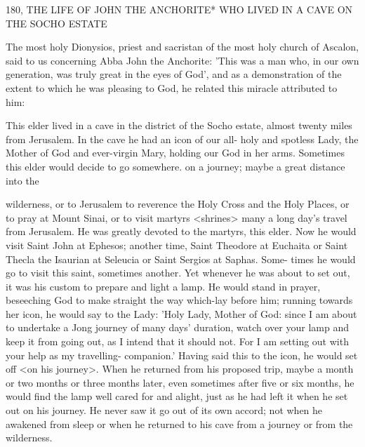 180, THE LIFE OF JOHN THE ANCHORITE*
WHO LIVED IN A CAVE ON THE SOCHO ESTATE

The most holy Dionysios, priest and sacristan of the most holy
church of Ascalon, said to us concerning Abba John the Anchorite:
'This was a man who, in our own generation, was truly great in the
eyes of God', and as a demonstration of the extent to which he was
pleasing to God, he related this miracle attributed to him:

This elder lived in a cave in the district of the Socho estate, almost
twenty miles from Jerusalem. In the cave he had an icon of our all-
holy and spotless Lady, the Mother of God and ever-virgin Mary,
holding our God in her arms. Sometimes this elder would decide to
go somewhere. on a journey; maybe a great distance into the

wilderness, or to Jerusalem to reverence the Holy Cross and the
Holy Places, or to pray at Mount Sinai, or to visit martyrs
<shrines> many a long day's travel from Jerusalem. He was greatly
devoted to the martyrs, this elder. Now he would visit Saint John
at Ephesos; another time, Saint Theodore at Euchaita or Saint
Thecla the Isaurian at Seleucia or Saint Sergios at Saphas. Some-
times he would go to visit this saint, sometimes another. Yet
whenever he was about to set out, it was his custom to prepare and
light a lamp. He would stand in prayer, beseeching God to make
straight the way which-lay before him; running towards her icon, he
would say to the Lady: 'Holy Lady, Mother of God: since I am
about to undertake a Jong journey of many days' duration, watch
over your lamp and keep it from going out, as I intend that it
should not. For I am setting out with your help as my travelling-
companion.' Having said this to the icon, he would set off <on his
journey>. When he returned from his proposed trip, maybe a month
or two months or three months later, even sometimes after five or
six months, he would find the lamp well cared for and alight, just
as he had left it when he set out on his journey. He never saw it go
out of its own accord; not when he awakened from sleep or when
he returned to his cave from a journey or from the wilderness.

